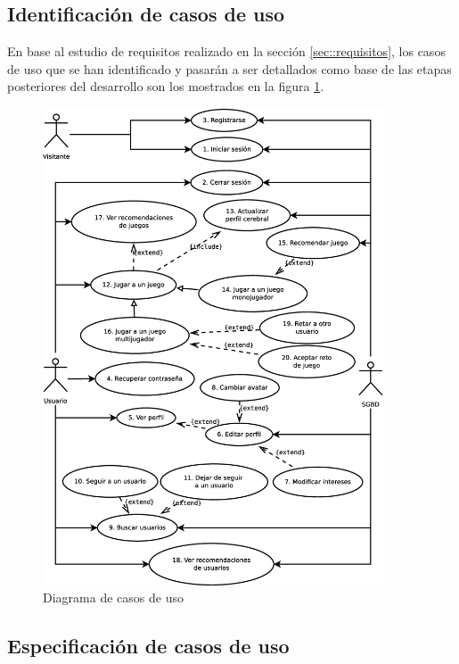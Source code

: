 \subsection{Identificación de casos de uso}

En base al estudio de requisitos realizado en la sección \ref{sec::requisitos}, los casos de uso que se han identificado y pasarán a ser detallados como base de las etapas posteriores del desarrollo son los mostrados en la figura \ref{fig::casos}.

\begin{figure}[H]
  \begin{center}
    \includegraphics[width=0.9\textwidth]{images/casos-uso.eps}
    \caption{Diagrama de casos de uso}
    \label{fig::casos}
  \end{center}
\end{figure}


\subsection{Especificación de casos de uso}

